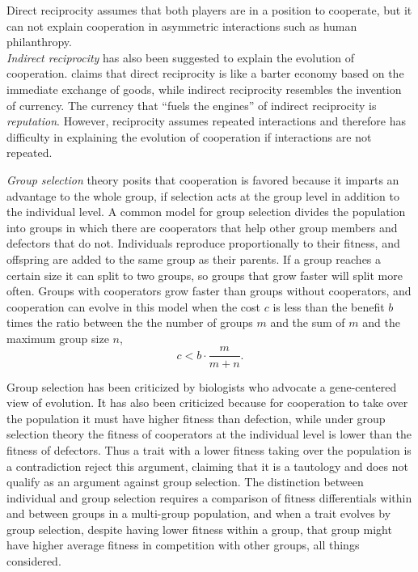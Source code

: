 \documentclass[12pt]{extarticle}
\begin{document}
{Direct reciprocity assumes that both players are in a position to cooperate, but it can not explain cooperation in asymmetric interactions such as human philanthropy. \\
\emph{Indirect reciprocity} has also been suggested to explain the evolution of cooperation.
\citet{nowak2006five} claims that direct reciprocity is like a barter economy based on the immediate exchange of goods, while indirect reciprocity resembles the invention of currency. 
The currency that ``fuels the engines'' of indirect reciprocity is \emph{reputation}. 
However, reciprocity assumes repeated interactions and therefore has difficulty in explaining the evolution of cooperation if  interactions are not repeated. 

\emph{Group selection} theory posits that cooperation is favored because it imparts an advantage to the whole group, if selection acts at the group level in addition to the individual level. A common model for group selection divides the population into groups in which there are cooperators that help  other group members and defectors that do not.  %
Individuals reproduce proportionally to their fitness, and offspring are added to the same group as their parents.
If a group reaches a certain size it can split to two groups, so groups that grow faster will split more often.
Groups with cooperators grow faster than groups without cooperators, and
cooperation can evolve in this model when the cost $c$ is less than the benefit $b$ times the ratio between the  the number of groups $m$ and the sum of $m$ and the maximum group size $n$,
\begin{equation} \label{eq:groupselection}
c < b \cdot \frac{m}{m+n} .
\end{equation}

Group selection has been criticized by biologists who advocate a gene-centered view of evolution. %
It has also been criticized because for cooperation to take over the population it must have higher fitness than defection, while under group selection theory the fitness of cooperators at the individual level is lower than the fitness of defectors. Thus a trait with a lower fitness taking over the population is a contradiction %
\citet{eldakar2011eight} reject this argument, claiming that it is a tautology and does not qualify as an argument against group selection. The distinction between individual and group selection requires a comparison of fitness differentials within and between groups in a multi-group population, and when a trait  evolves by group selection, despite having lower fitness within a group, that group might have higher average fitness in competition with other groups, all things considered. %

}
\end{document}
